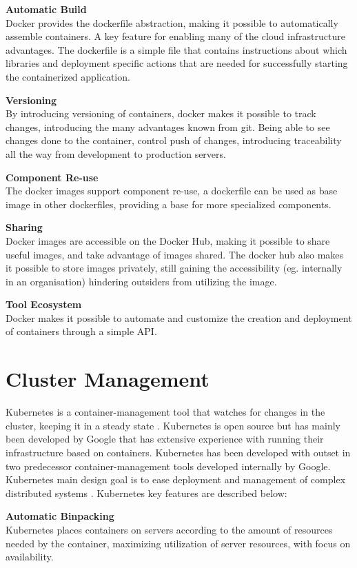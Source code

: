 \textbf{Automatic Build}\\
Docker provides the dockerfile abstraction, making it possible to automatically assemble containers. A key feature for enabling many of the cloud infrastructure advantages. The dockerfile is a simple file that contains instructions about which libraries and deployment specific actions that are needed for successfully starting the containerized application.

\textbf{Versioning}\\
By introducing versioning of containers, docker makes it possible to track changes, introducing the many advantages known from git. Being able to see changes done to the container, control push of changes, introducing traceability all the way from development to production servers.

\textbf{Component Re-use}\\
The docker images support component re-use, a dockerfile can be used as base image in other dockerfiles, providing a base for more specialized components.

\textbf{Sharing}\\
Docker images are accessible on the Docker Hub, making it possible to share useful images, and take advantage of images shared. The docker hub also makes it possible to store images privately, still gaining the accessibility (eg. internally in an organisation) hindering outsiders from utilizing the image.

\textbf{Tool Ecosystem}\\
Docker makes it possible to automate and customize the creation and deployment of containers through a simple API.

\section{Cluster Management}
\label{sec:cluster}
Kubernetes is a container-management tool that watches for changes in the cluster, keeping it in a steady state \cite{burns2016borg}. Kubernetes is open source but has mainly been developed by Google that has extensive experience with running their infrastructure based on containers. Kubernetes has been developed with outset in two predecessor container-management tools developed internally by Google. Kubernetes main design goal is to ease deployment and management of complex distributed systems \cite{kubernetes_frontpage}. Kubernetes key features are described below:

\textbf{Automatic Binpacking}\\
Kubernetes places containers on servers according to the amount of resources needed by the container, maximizing utilization of server resources, with focus on availability.

